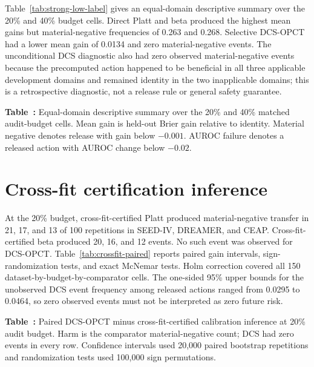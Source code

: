 \documentclass[preprint,12pt]{elsarticle}
\begin{document}
Table~\ref{tab:strong-low-label} gives an equal-domain descriptive summary over the 20\% and 40\% budget cells. Direct Platt and beta produced the highest mean gains but material-negative frequencies of 0.263 and 0.268. Selective DCS-OPCT had a lower mean gain of 0.0134 and zero material-negative events. The unconditional DCS diagnostic also had zero observed material-negative events because the precomputed action happened to be beneficial in all three applicable development domains and remained identity in the two inapplicable domains; this is a retrospective diagnostic, not a release rule or general safety guarantee.

\begin{center}
\begin{minipage}{\textwidth}
\textbf{Table~\thetable:} Equal-domain descriptive summary over the 20\% and 40\% matched audit-budget cells. Mean gain is held-out Brier gain relative to identity. Material negative denotes release with gain below $-0.001$. AUROC failure denotes a released action with AUROC change below $-0.02$.
\label{tab:strong-low-label}
\par\medskip
\centering
\small
\resizebox{\textwidth}{!}{}
\end{minipage}
\end{center}

\section{Cross-fit certification inference}

At the 20\% budget, cross-fit-certified Platt produced material-negative transfer in 21, 17, and 13 of 100 repetitions in SEED-IV, DREAMER, and CEAP. Cross-fit-certified beta produced 20, 16, and 12 events. No such event was observed for DCS-OPCT. Table~\ref{tab:crossfit-paired} reports paired gain intervals, sign-randomization tests, and exact McNemar tests. Holm correction covered all 150 dataset-by-budget-by-comparator cells. The one-sided 95\% upper bounds for the unobserved DCS event frequency among released actions ranged from 0.0295 to 0.0464, so zero observed events must not be interpreted as zero future risk.

\begin{center}
\begin{minipage}{\textwidth}
\textbf{Table~\thetable:} Paired DCS-OPCT minus cross-fit-certified calibration inference at 20\% audit budget. Harm is the comparator material-negative count; DCS had zero events in every row. Confidence intervals used 20,000 paired bootstrap repetitions and randomization tests used 100,000 sign permutations.
\label{tab:crossfit-paired}
\par\medskip
\centering
\small
\resizebox{\textwidth}{!}{}
\end{minipage}
\end{center}
\end{document}
